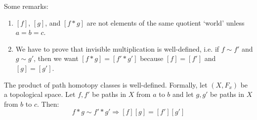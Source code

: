 Some remarks: 
\begin{enumerate}
	\item $[f]$, $[g]$, and $[f \ast g]$ are not elements of the same quotient `world' unless $a = b = c$. 
	\item We have to prove that invisible multiplication is well-defined, i.e. if $f \sim f'$ and $g \sim g'$, then we want $[f \ast g] = [f' \ast g']$ because $[f] = [f']$ and $[g] = [g']$. 
\end{enumerate}
\begin{lemma}
	[Important] The product of path homotopy classes is well-defined. Formally, let $(X,F_x)$ be a topological space. Let $f,f'$ be paths in $X$ from $a$ to $b$ and let $g,g'$ be paths in $X$ from $b$ to $c$. Then:
	\[f*g \sim f'*g' \Rightarrow [f][g] = [f'][g']\]
\end{lemma}
